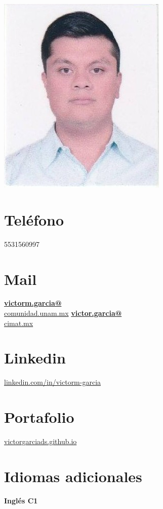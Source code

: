 \documentclass[]{friggeri-cv}
\begin{document}
\begin{aside}
  \includegraphics[scale=0.268]{img/foto2.png}
  \section{Teléfono}
    5531560997
  \section{Mail}
    \href{mailto:victorm.garcia@comunidad.unam.mx}{\textbf{victorm.garcia@}\\comunidad.unam.mx}
    \href{mailto:victor.garcia@cimat.mx}{\textbf{victor.garcia@}\\cimat.mx}
    \section{Linkedin}
    \url{linkedin.com/in/victorm-garcia}%
    \section{Portafolio}
    \url{victorgarciads.github.io}%
     \section{Idiomas adicionales}
    \textbf{Inglés C1}

\end{aside}
\end{document}
